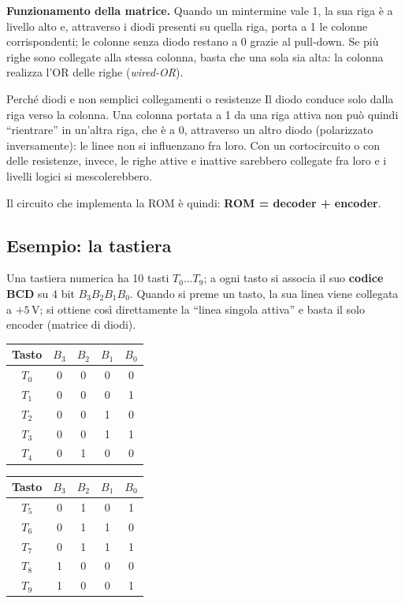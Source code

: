 \noindent\textbf{Funzionamento della matrice.} Quando un mintermine vale 1, la sua riga è a
livello alto e, attraverso i diodi presenti su quella riga, porta a 1 le colonne
corrispondenti; le colonne senza diodo restano a 0 grazie al pull-down. Se più righe sono
collegate alla stessa colonna, basta che una sola sia alta: la colonna realizza l'OR delle
righe (\emph{wired-OR}).

\begin{osservazione}{Perché diodi e non semplici collegamenti o resistenze}
Il diodo conduce solo dalla riga verso la colonna. Una colonna portata a 1 da una riga attiva
non può quindi ``rientrare'' in un'altra riga, che è a 0, attraverso un altro diodo
(polarizzato inversamente): le linee non si influenzano fra loro. Con un cortocircuito o con
delle resistenze, invece, le righe attive e inattive sarebbero collegate fra loro e i livelli
logici si mescolerebbero.
\end{osservazione}

\noindent Il circuito che implementa la ROM è quindi: \textbf{ROM = decoder + encoder}.

\subsection{Esempio: la tastiera}

Una tastiera numerica ha 10 tasti $T_0\ldots T_9$; a ogni tasto si associa il suo
\textbf{codice BCD} su 4 bit $B_3B_2B_1B_0$. Quando si preme un tasto, la sua linea viene
collegata a $+5$\,V; si ottiene così direttamente la ``linea singola attiva'' e basta il solo
encoder (matrice di diodi).

\begin{center}
\small
\begin{tabular}{c|cccc}
\toprule
Tasto & $B_3$ & $B_2$ & $B_1$ & $B_0$ \\
\midrule
$T_0$ & 0 & 0 & 0 & 0 \\
$T_1$ & 0 & 0 & 0 & 1 \\
$T_2$ & 0 & 0 & 1 & 0 \\
$T_3$ & 0 & 0 & 1 & 1 \\
$T_4$ & 0 & 1 & 0 & 0 \\
\bottomrule
\end{tabular}
\qquad
\begin{tabular}{c|cccc}
\toprule
Tasto & $B_3$ & $B_2$ & $B_1$ & $B_0$ \\
\midrule
$T_5$ & 0 & 1 & 0 & 1 \\
$T_6$ & 0 & 1 & 1 & 0 \\
$T_7$ & 0 & 1 & 1 & 1 \\
$T_8$ & 1 & 0 & 0 & 0 \\
$T_9$ & 1 & 0 & 0 & 1 \\
\bottomrule
\end{tabular}
\end{center}

